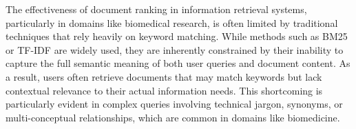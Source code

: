 
The effectiveness of document ranking in information retrieval systems, particularly in domains like biomedical research, is often limited by traditional techniques that rely heavily on keyword matching. While methods such as BM25 \cite{enwiki:1194828429} or TF-IDF \cite{enwiki:1236851603} are widely used, they are inherently constrained by their inability to capture the full semantic meaning of both user queries and document content. As a result, users often retrieve documents that may match keywords but lack contextual relevance to their actual information needs. This shortcoming is particularly evident in complex queries involving technical jargon, synonyms, or multi-conceptual relationships, which are common in domains like biomedicine.

